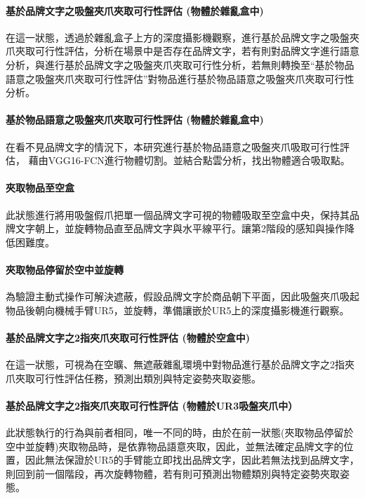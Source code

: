 \paragraph{基於品牌文字之吸盤夾爪夾取可行性評估 (物體於雜亂盒中)}
在這一狀態，透過於雜亂盒子上方的深度攝影機觀察，進行基於品牌文字之吸盤夾爪夾取可行性評估，分析在場景中是否存在品牌文字，若有則對品牌文字進行語意分析，與進行基於品牌文字之吸盤夾爪夾取可行性分析，若無則轉換至``基於物品語意之吸盤夾爪夾取可行性評估''對物品進行基於物品語意之吸盤夾爪夾取可行性分析。

\paragraph{基於物品語意之吸盤夾爪夾取可行性評估 (物體於雜亂盒中)}

在看不見品牌文字的情況下，本研究進行基於物品語意之吸盤夾爪吸取可行性評估，
藉由VGG16-FCN進行物體切割。並結合點雲分析，找出物體適合吸取點。

\paragraph{夾取物品至空盒}
此狀態進行將用吸盤假爪把單一個品牌文字可視的物體吸取至空盒中央，保持其品牌文字朝上，並旋轉物品直至品牌文字與水平線平行。讓第2階段的感知與操作降低困難度。

\paragraph{夾取物品停留於空中並旋轉}
為驗證主動式操作可解決遮蔽，假設品牌文字於商品朝下平面，因此吸盤夾爪吸起物品後朝向機械手臂UR5，並旋轉，準備讓嵌於UR5上的深度攝影機進行觀察。

\paragraph{基於品牌文字之2指夾爪夾取可行性評估 (物體於空盒中)}
在這一狀態，可視為在空曠、無遮蔽雜亂環境中對物品進行基於品牌文字之2指夾爪夾取可行性評估任務，預測出類別與特定姿勢夾取姿態。

\paragraph{基於品牌文字之2指夾爪夾取可行性評估 (物體於UR3吸盤夾爪中）}
此狀態執行的行為與前者相同，唯一不同的時，由於在前一狀態(夾取物品停留於空中並旋轉)夾取物品時，是依靠物品語意夾取，因此，並無法確定品牌文字的位置，因此無法保證於UR5的手臂能立即找出品牌文字，因此若無法找到品牌文字，則回到前一個階段，再次旋轉物體，若有則可預測出物體類別與特定姿勢夾取姿態。

